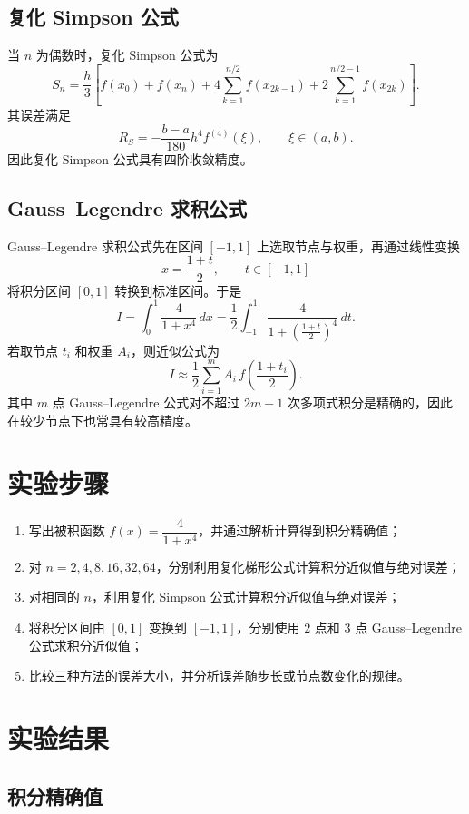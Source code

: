 \documentclass[12pt,a4paper]{ctexart}
\begin{document}
\subsection{复化 Simpson 公式}

当 $n$ 为偶数时，复化 Simpson 公式为
\[
S_n=\frac{h}{3}\left[f(x_0)+f(x_n)+4\sum_{k=1}^{n/2}f(x_{2k-1})+2\sum_{k=1}^{n/2-1}f(x_{2k})\right].
\]
其误差满足
\[
R_S=-\frac{b-a}{180}h^4 f^{(4)}(\xi),\qquad \xi\in(a,b).
\]
因此复化 Simpson 公式具有四阶收敛精度。

\subsection{Gauss--Legendre 求积公式}

Gauss--Legendre 求积公式先在区间 $[-1,1]$ 上选取节点与权重，再通过线性变换
\[
x=\frac{1+t}{2},\qquad t\in[-1,1]
\]
将积分区间 $[0,1]$ 转换到标准区间。于是
\[
I=\int_0^1 \frac{4}{1+x^4}\,dx
=\frac{1}{2}\int_{-1}^1 \frac{4}{1+\left(\frac{1+t}{2}\right)^4}\,dt.
\]
若取节点 $t_i$ 和权重 $A_i$，则近似公式为
\[
I\approx \frac{1}{2}\sum_{i=1}^m A_i\,f\!\left(\frac{1+t_i}{2}\right).
\]
其中 $m$ 点 Gauss--Legendre 公式对不超过 $2m-1$ 次多项式积分是精确的，因此在较少节点下也常具有较高精度。

\section{实验步骤}

\begin{enumerate}
    \item 写出被积函数 $f(x)=\dfrac{4}{1+x^4}$，并通过解析计算得到积分精确值；
    \item 对 $n=2,4,8,16,32,64$，分别利用复化梯形公式计算积分近似值与绝对误差；
    \item 对相同的 $n$，利用复化 Simpson 公式计算积分近似值与绝对误差；
    \item 将积分区间由 $[0,1]$ 变换到 $[-1,1]$，分别使用 $2$ 点和 $3$ 点 Gauss--Legendre 公式求积分近似值；
    \item 比较三种方法的误差大小，并分析误差随步长或节点数变化的规律。
\end{enumerate}

\section{实验结果}

\subsection{积分精确值}
\end{document}
